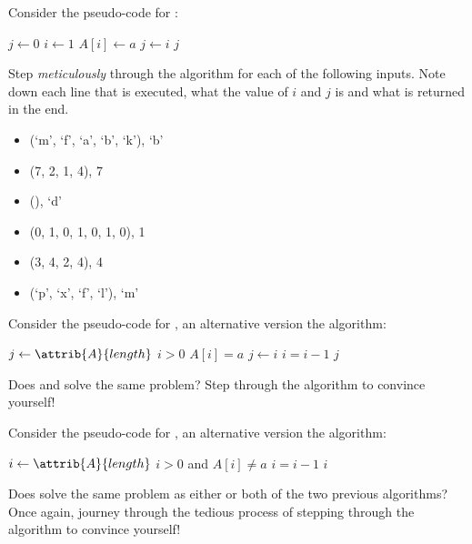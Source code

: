 \documentclass{article}
\begin{document}
\thispagestyle{fancy}

\begin{Exercise}
    \noindent
    Consider the pseudo-code for :

    \begin{codebox}
        \li $j \gets 0$
        \li \For $i \gets 1$ \To {} \Do
            \li \If $A[i] \gets a$ \Then
                \li $j \gets i$
            \End
        \End
        \li \Return $j$
    \end{codebox}

    \Question
    Step \textit{meticulously} through the algorithm for each of the following
    inputs. Note down each line that is executed, what the value of $i$ and $j$
    is and what is returned in the end.

    \begin{itemize}
        \item (`m', `f', `a', `b', `k'), `b'
        \item (7, 2, 1, 4), 7
        \item (), `d'
        \item (0, 1, 0, 1, 0, 1, 0), 1
        \item (3, 4, 2, 4), 4
        \item (`p', `x', `f', `l'), `m'
    \end{itemize}

    \medskip
    \ExeText
    Consider the pseudo-code for , an alternative version
    the algorithm:
    
    \begin{codebox}
        \li $j \gets \attrib{A}{length}$
        \li \While $i > 0$ \Do
            \li \If $A[i] = a$ \Then
                \li $j \gets i$
            \End
            \li $i = i - 1$
        \End
        \li \Return $j$
    \end{codebox}

    \Question
    Does  and  solve the same problem?
    Step through the algorithm to convince yourself!

    \medskip
    \ExeText
    Consider the pseudo-code for , an alternative version
    the algorithm:
    
    \begin{codebox}
        \li $i \gets \attrib{A}{length}$
        \li \While $i > 0$ and $A[i] \neq a$ \Then
            \li $i = i - 1$
        \End
        \li \Return $i$
    \end{codebox}

    \Question
    Does  solve the same problem as either or both of the
    two previous algorithms? Once again, journey through the tedious process of
    stepping through the algorithm to convince yourself!

\end{Exercise}
    
\end{document}
